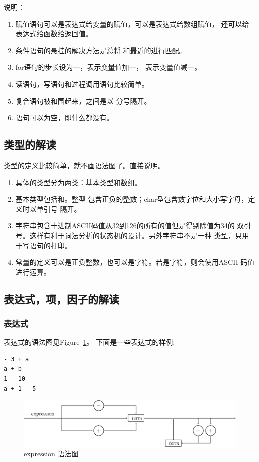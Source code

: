 说明：
\begin{enumerate}
	\item 赋值语句可以是表达式给变量的赋值，可以是表达式给数组赋值，
		还可以给表达式给函数给返回值。
	\item 条件语句的悬挂的解决方法是总将
		和最近的进行匹配。
	\item for语句的步长设为一，表示变量值加一，
		表示变量值减一。
	\item 读语句，写语句和过程调用语句比较简单。
	\item 复合语句被和围起来，之间是以
		分号隔开。
	\item 语句可以为空，即什么都没有。
\end{enumerate}
\subsection{类型的解读}








类型的定义比较简单，就不画语法图了。直接说明。
\begin{enumerate}
	\item 具体的类型分为两类：基本类型和数组。
	\item 基本类型包括和。整型
		包含正负的整数；char型包含数字位和大小写字母，定义时以单引号
		隔开。
	\item 字符串包含十进制ASCII码值从32到126的所有的值但是得剔除值为34的
		双引号。这样有利于词法分析的状态机的设计。另外字符串不是一种
		类型，只用于写语句的打印。
	\item 常量的定义可以是正负整数，也可以是字符。若是字符，则会使用ASCII
		码值进行运算。
\end{enumerate}
\subsection{表达式，项，因子的解读}
\subsubsection{表达式}

表达式的语法图见Figure~\ref{expression}。
下面是一些表达式的样例:
\begin{verbatim}
- 3 + a
a + b
1 - 10
a + 1 - 5
\end{verbatim}
\begin{figure}[h!]
\begin{center}
    \includegraphics[scale=.8]{Figures/expression.eps}
\end{center}
\caption{expression 语法图}
\label{expression}
\end{figure}
